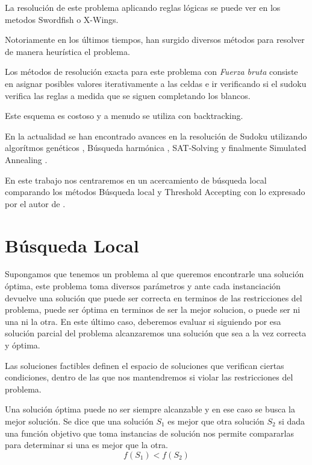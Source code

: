\documentclass[a4paper,spanish]{article}
\begin{document}
La resolución de este problema aplicando reglas lógicas se puede ver en los
metodos Swordfish  o X-Wings.

Notoriamente en los últimos tiempos, han surgido diversos métodos para resolver
de manera heurística el problema.

Los métodos de resolución exacta para este problema con \emph{Fuerza bruta}
consiste en asignar posibles valores iterativamente a las celdas e ir
verificando si el sudoku verifica las reglas a medida que se siguen completando
los blancos.

Este esquema es costoso y a menudo se utiliza con backtracking.


En la actualidad se han encontrado avances en la resolución de Sudoku utilizando
algorítmos genéticos \cite{mantere2007solving}, Búsqueda harmónica
\cite{geem2007harmony}, SAT-Solving \cite{lynce2006sudoku} y finalmente
Simulated Annealing \cite{lewis2007metaheuristics}.


En este trabajo nos centraremos en un acercamiento de búsqueda local comparando
los métodos Búsqueda local\cite{aarts2003local} y Threshold
Accepting\cite{dueck1990threshold} con lo expresado por el autor de
\cite{lewis2007metaheuristics}.

\section{Búsqueda Local}

Supongamos que tenemos un problema al que queremos encontrarle una solución
óptima, este problema toma diversos parámetros y ante cada instanciación
devuelve una solución que puede ser correcta en terminos de las restricciones
del problema, puede ser óptima en terminos de ser la mejor solucion, o puede ser
ni una ni la otra. En este último caso, deberemos evaluar si siguiendo por esa
solución parcial del problema alcanzaremos una solución que sea a la vez
correcta y óptima.

Las soluciones factibles definen el espacio de soluciones que verifican ciertas
condiciones, dentro de las que nos mantendremos si violar las restricciones del
problema.

Una solución óptima puede no ser siempre alcanzable y en ese caso se busca la
mejor solución. Se dice que una solución $S_1$ es mejor que otra solución $S_2$ si
dada una función objetivo  que toma instancias de solución nos permite
compararlas para determinar si una es mejor que la otra.
\begin{equation}
    f(S_1) < f(S_2) 
\end{equation}
\end{document}
